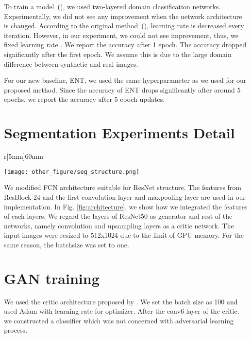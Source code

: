 \documentclass{article} \usepackage{iclr2018_conference,times}
\begin{document}
To train a model~(\cite{ganin2014unsupervised}), we used two-layered domain classification networks. Experimentally, we did not see any improvement when the network architecture is changed. According to the original method~(\cite{ganin2014unsupervised}), learning rate is decreased every iteration. However, in our experiment, we could not see improvement, thus, we fixed learning rate . We report the accuracy after 1 epoch. The accuracy dropped significantly after the first epoch. We assume this is due to the large domain difference between synthetic and real images.

For our new baseline, ENT, we used the same hyperparameter as we used for our proposed method. Since the accuracy of ENT drops significantly after around 5 epochs, we report the accuracy after 5 epoch updates.
\vspace{-3mm}
\section{Segmentation Experiments Detail}
\vspace{-3mm}
\begin{wrapfigure}[11]{r}[5mm]{60mm}
  \begin{center}
    \vspace{-16mm}
  \texttt{[image: other\_figure/seg\_structure.png]}
  \end{center}
        \vspace{-4mm}
  \caption{Overview of architecture for semantic segmentation}

  \label{fig:architecture}
  \end{wrapfigure}
We modified FCN \cite{long2015fully} architecture suitable for ResNet structure. The features from ResBlock 24 and the first convolution layer and maxpooling layer are used in our implementation. In Fig. \ref{fig:architecture}, we show how we integrated the features of each layers. We regard the layers of ResNet50 as generator and rest of the networks, namely convolution and upsampling layers as a critic network. The input images were resized to 512x1024 due to the limit of GPU memory. For the same reason, the batchsize was set to one. 
\vspace{-3mm}
\section{GAN training}
\vspace{-3mm}
We used the critic architecture proposed by \cite{salimans2016improved}. We set the batch size as 100 and used Adam with learning rate  for optimizer. 
After the conv6 layer of the critic, we constructed a classifier which was not concerned with adversarial learning process. 
\end{document}
